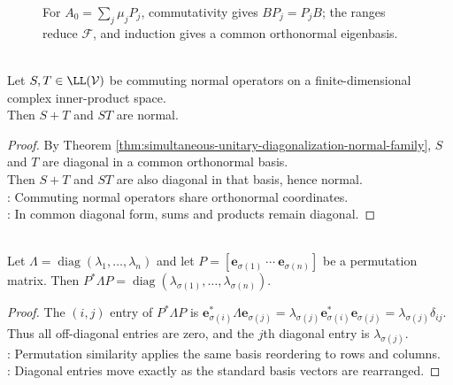 \begin{figure}[H]
  \centering
  
  \caption{For $A_0=\sum_j\mu_jP_j$, commutativity gives $BP_j=P_jB$; the ranges reduce $\mathcal{F}$, and induction gives a common orthonormal eigenbasis.}
  \label{fig:simultaneous-normal-diagonalization}
\end{figure}

\begin{corollary} \label{cor:commuting-normal-sums-products-normal} \\
Let $S,T\in\LL(\mathcal{V})$ be commuting normal operators on a finite-dimensional complex inner-product space.\\
Then $S+T$ and $ST$ are normal.
\begin{proof}
By Theorem \ref{thm:simultaneous-unitary-diagonalization-normal-family}, $S$ and $T$ are diagonal in a common orthonormal basis.\\
Then $S+T$ and $ST$ are also diagonal in that basis, hence normal.\\
: Commuting normal operators share orthonormal coordinates.\\
: In common diagonal form, sums and products remain diagonal.
\end{proof}
\end{corollary}

\begin{proposition} \label{prop:permutation-similarity-reorders-diagonal} \\
Let $\Lambda=\operatorname{diag}(\lambda_1,\ldots,\lambda_n)$ and let $P=[\mathbf{e}_{\sigma(1)}\ \cdots\ \mathbf{e}_{\sigma(n)}]$ be a permutation matrix. Then $P^*\Lambda P=\operatorname{diag}(\lambda_{\sigma(1)},\ldots,\lambda_{\sigma(n)})$.
\begin{proof}
The $(i,j)$ entry of $P^*\Lambda P$ is $\mathbf{e}_{\sigma(i)}^*\Lambda\mathbf{e}_{\sigma(j)} =\lambda_{\sigma(j)}\mathbf{e}_{\sigma(i)}^*\mathbf{e}_{\sigma(j)} =\lambda_{\sigma(j)}\delta_{ij}$.\\
Thus all off-diagonal entries are zero, and the $j$th diagonal entry is $\lambda_{\sigma(j)}$.\\
: Permutation similarity applies the same basis reordering to rows and columns.\\
: Diagonal entries move exactly as the standard basis vectors are rearranged.
\end{proof}
\end{proposition}

